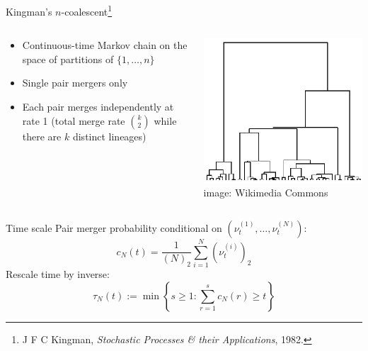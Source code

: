 \documentclass[aspectratio=169]{beamer}
\theoremstyle{definition}
\newcommand{\vt}[2][t]{\nu_{#1}^{(#2)}}
\begin{document}
\begin{frame}{Kingman's $n$-coalescent\footnote[frame]{J F C Kingman, \textit{Stochastic Processes \& their Applications}, 1982.}}
\begin{columns}
\begin{column}{0.45\textwidth}
\begin{itemize}
\item Continuous-time Markov chain on the space of partitions of $\{1,\dots,n\}$
\item Single pair mergers only
\item Each pair merges independently at rate 1 (total merge rate $\binom{k}{2}$ while there are $k$ distinct lineages)
\end{itemize}
\end{column}
\begin{column}{0.45\textwidth}
\includegraphics[width=\textwidth]{kingman.png}
\hspace*{\fill} \tiny{image: Wikimedia Commons}
\end{column}
\end{columns}
\end{frame}


\begin{frame}{Time scale}
Pair merger probability conditional on $( \vt{1},\dots, \vt{N} )$:
\begin{equation*}
c_N(t) = \frac{1}{(N)_2} \sum_{i=1}^N (\vt{i})_2
\end{equation*}
\pause
Rescale time by inverse:
\begin{equation*}
\tau_N(t) := \min\left\{ s\geq 1 : \sum_{r=1}^s c_N(r) \geq t \right\}
\end{equation*}
\end{frame}
\end{document}

